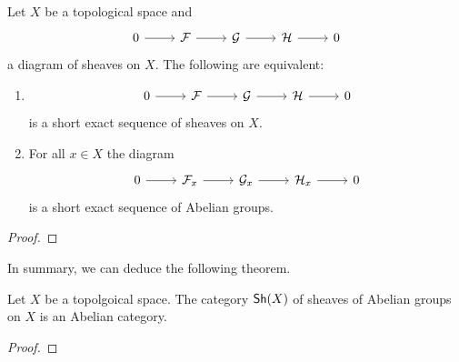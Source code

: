 \begin{proposition}\label{prop: exactness on stalks}
    Let $X$ be a topological space and 
    $$%
    \begin{tikzcd}
        0 & \Fcal & \Gcal & \Hcal & 0
        \arrow[from=1-1, to=1-2]
        \arrow[from=1-2, to=1-3]
        \arrow[from=1-3, to=1-4]
        \arrow[from=1-4, to=1-5]
    \end{tikzcd}$$
    a diagram of sheaves on $X$. The following are equivalent:
    \begin{enumerate}[label=(\alph*)]
        \item $$%
    \begin{tikzcd}
        0 & \Fcal & \Gcal & \Hcal & 0
        \arrow[from=1-1, to=1-2]
        \arrow[from=1-2, to=1-3]
        \arrow[from=1-3, to=1-4]
        \arrow[from=1-4, to=1-5]
    \end{tikzcd}$$
    is a short exact sequence of sheaves on $X$. 
    \item For all $x\in X$ the diagram 
    $$%
    \begin{tikzcd}
        0 & \Fcal_{x} & \Gcal_{x} & \Hcal_{x} & 0
        \arrow[from=1-1, to=1-2]
        \arrow[from=1-2, to=1-3]
        \arrow[from=1-3, to=1-4]
        \arrow[from=1-4, to=1-5]
    \end{tikzcd}$$
    is a short exact sequence of Abelian groups. 
    \end{enumerate}
\end{proposition}
\begin{proof}
\end{proof}
In summary, we can deduce the following theorem. 
\begin{theorem}\label{thm: sheaves of Abelian groups form an Abelian category}
    Let $X$ be a topolgoical space. The category $\mathsf{Sh}(X)$ of sheaves of Abelian groups on $X$ is an Abelian category. 
\end{theorem}
\begin{proof}
\end{proof}
